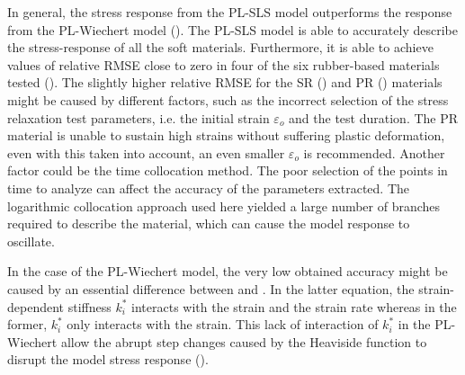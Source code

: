 In general, the stress response from the PL-SLS model outperforms the response from the PL-Wiechert model (). The PL-SLS model is able to accurately describe the stress-response of all the soft materials. Furthermore, it is able to achieve values of relative RMSE close to zero in four of the six rubber-based materials tested (). The slightly higher relative RMSE for the SR () and PR () materials might be caused by different factors, such as the incorrect selection of the stress relaxation test parameters, i.e. the initial strain $\varepsilon_o$ and the test duration. The PR material is unable to sustain high strains without suffering plastic deformation, even with this taken into account, an even smaller $\varepsilon_o$ is recommended. Another factor could be the time collocation method. The poor selection of the points in time to analyze can affect the accuracy of the parameters extracted. The logarithmic collocation approach used here yielded a large number of branches required to describe the material, which can cause the model response to oscillate.

In the case of the PL-Wiechert model, the very low obtained accuracy might be caused by an essential difference between  and . In the latter equation, the strain-dependent stiffness $k_i^*$ interacts with the strain and the strain rate whereas in the former, $k_i^*$ only interacts with the strain. This lack of interaction of $k_i^*$ in the PL-Wiechert allow the abrupt step changes caused by the Heaviside function to disrupt the model stress response ().

